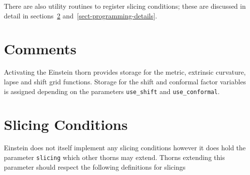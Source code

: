 \documentclass{article}
\begin{document}
There are also utility routines to register slicing conditions;
these are discussed in detail in sections~\ref{sect-slicing-conditions}
and~\ref{sect-programming-details}.


\section{Comments}

Activating the Einstein thorn provides storage for the metric,
extrinsic curvature, lapse and shift grid functions. Storage
for the shift and conformal factor variables is assigned 
depending on the parameters {\tt use\_shift} and {\tt use\_conformal}.


\section{Slicing Conditions}
\label{sect-slicing-conditions}

Einstein does not itself implement any slicing conditions
however it does hold the parameter 
{\tt slicing} which other thorns may extend.
Thorns extending this parameter should
respect the following definitions for slicings
\end{document}

